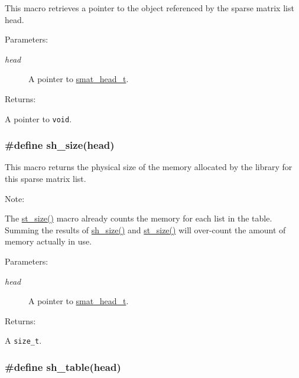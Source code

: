 This macro retrieves a pointer to the object referenced by the sparse matrix list head.\begin{Desc}
\item[Parameters: ]\par
\begin{description}
\item[{\em 
head}]A pointer to \hyperlink{group__dbprim__smat_a1}{smat\_\-head\_\-t}.\end{description}
\end{Desc}
\begin{Desc}
\item[Returns: ]\par
A pointer to {\tt void}. \end{Desc}
\hypertarget{group__dbprim__smat_a37}{
\subsubsection[sh\_\-size]{\setlength{\rightskip}{0pt plus 5cm}\#define sh\_\-size(head)}}
\label{group__dbprim__smat_a37}


This macro returns the physical size of the memory allocated by the library for this sparse matrix list.

\begin{Desc}
\item[Note: ]\par
The \hyperlink{group__dbprim__smat_a27}{st\_\-size()} macro already counts the memory for each list in the table. Summing the results of \hyperlink{group__dbprim__smat_a37}{sh\_\-size()} and \hyperlink{group__dbprim__smat_a27}{st\_\-size()} will over-count the amount of memory actually in use.\end{Desc}
\begin{Desc}
\item[Parameters: ]\par
\begin{description}
\item[{\em 
head}]A pointer to \hyperlink{group__dbprim__smat_a1}{smat\_\-head\_\-t}.\end{description}
\end{Desc}
\begin{Desc}
\item[Returns: ]\par
A {\tt size\_\-t}. \end{Desc}
\hypertarget{group__dbprim__smat_a31}{
\subsubsection[sh\_\-table]{\setlength{\rightskip}{0pt plus 5cm}\#define sh\_\-table(head)}}
\label{group__dbprim__smat_a31}


